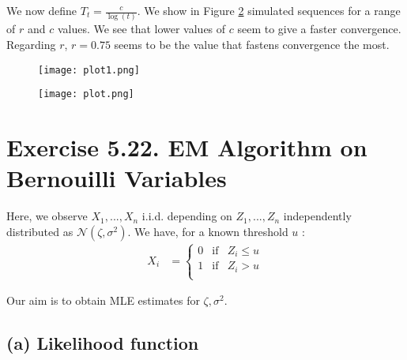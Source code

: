 \documentclass{article}
\begin{document}
We now define $T_t = \frac{c}{\log(t)}$. We show in Figure \ref{fig:sa2} simulated
sequences for a range of $r$ and $c$ values. We see that lower values of $c$
seem to give a faster convergence. Regarding $r$, $r=0.75$ seems to be the value that
fastens convergence the most.

    \begin{figure}
        \begin{center}
            \label{fig:sa1}
            \texttt{[image: plot1.png]} 
        \end{center}
    \end{figure}

    \begin{figure}
        \begin{center}
            \label{fig:sa2}
            \texttt{[image: plot.png]}
        \end{center}
    \end{figure}

\newpage
\section*{Exercise 5.22. EM Algorithm on Bernouilli Variables}

Here, we observe $X_1, ..., X_n$ i.i.d. depending on $Z_1, ..., Z_n$ 
independently distributed as $\mathcal{N}(\zeta, \sigma^2)$. 
We have, for a known threshold $u$ : 
\begin{align*}
    X_i &= \left \{ \begin{array}{ccc}
        0 & \text{if} & Z_i \leq u \\
        1 & \text{if} & Z_i > u \\
    \end{array} \right .
\end{align*}

Our aim is to obtain MLE estimates for $\zeta, \sigma^2$.
\subsection*{(a) Likelihood function}
\end{document}
